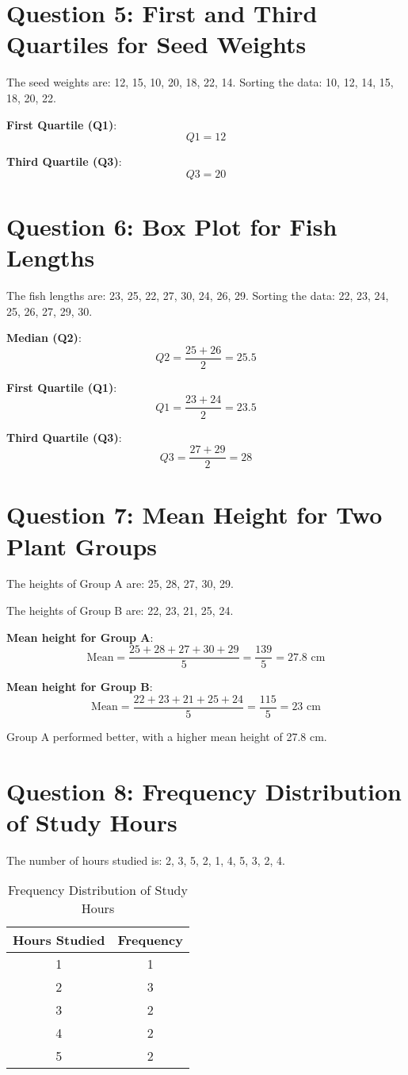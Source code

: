 \documentclass[11pt]{article}
\begin{document}
\section*{Question 5: First and Third Quartiles for Seed Weights}
The seed weights are: 12, 15, 10, 20, 18, 22, 14. Sorting the data: 10, 12, 14, 15, 18, 20, 22.

\textbf{First Quartile (Q1)}:
\[
Q1 = 12
\]

\textbf{Third Quartile (Q3)}:
\[
Q3 = 20
\]

\section*{Question 6: Box Plot for Fish Lengths}
The fish lengths are: 23, 25, 22, 27, 30, 24, 26, 29. Sorting the data: 22, 23, 24, 25, 26, 27, 29, 30.

\textbf{Median (Q2)}:
\[
Q2 = \frac{25 + 26}{2} = 25.5
\]

\textbf{First Quartile (Q1)}:
\[
Q1 = \frac{23 + 24}{2} = 23.5
\]

\textbf{Third Quartile (Q3)}:
\[
Q3 = \frac{27 + 29}{2} = 28
\]

\section*{Question 7: Mean Height for Two Plant Groups}
The heights of Group A are: 25, 28, 27, 30, 29.

The heights of Group B are: 22, 23, 21, 25, 24.

\textbf{Mean height for Group A}:
\[
\text{Mean} = \frac{25 + 28 + 27 + 30 + 29}{5} = \frac{139}{5} = 27.8 \text{ cm}
\]

\textbf{Mean height for Group B}:
\[
\text{Mean} = \frac{22 + 23 + 21 + 25 + 24}{5} = \frac{115}{5} = 23 \text{ cm}
\]

Group A performed better, with a higher mean height of 27.8 cm.

\section*{Question 8: Frequency Distribution of Study Hours}
The number of hours studied is: 2, 3, 5, 2, 1, 4, 5, 3, 2, 4.

\begin{table}[h]
\centering
\begin{tabular}{|c|c|}
\hline
\textbf{Hours Studied} & \textbf{Frequency} \\
\hline
1 & 1 \\
\hline
2 & 3 \\
\hline
3 & 2 \\
\hline
4 & 2 \\
\hline
5 & 2 \\
\hline
\end{tabular}
\caption{Frequency Distribution of Study Hours}
\end{table}
\end{document}

